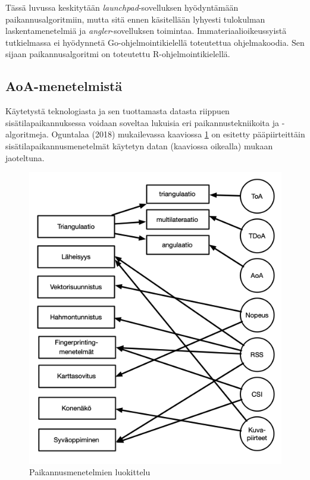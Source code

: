\documentclass[
  12pt,
  a4paper, twoside]{book}
\begin{document}
Tässä luvussa keskitytään \emph{launchpad}-sovelluksen hyödyntämään paikannusalgoritmiin, mutta sitä ennen käsitellään lyhyesti tulokulman laskentamenetelmiä ja \emph{angler}-sovelluksen toimintaa. Immateriaalioikeussyistä tutkielmassa ei hyödynnetä Go-ohjelmointikielellä toteutettua ohjelmakoodia. Sen sijaan paikannusalgoritmi on toteutettu R-ohjelmointikielellä.

\subsection{AoA-menetelmistä} \label{aoa}

Käytetystä teknologiasta ja sen tuottamasta datasta riippuen sisätilapaikannuksessa voidaan soveltaa lukuisia eri paikannustekniikoita ja -algoritmeja. Oguntalaa (2018) \citep{oguntala-2018} mukailevassa kaaviossa \ref{fig:paikannusmenetelmat} on esitetty pääpiirteittäin sisätilapaikannusmenetelmät käytetyn datan (kaaviossa oikealla) mukaan jaoteltuna.

\begin{figure}[H]
\centering
\includegraphics[width=12.5cm]{paikannusmenetelmat}
\caption{Paikannusmenetelmien luokittelu}
\label{fig:paikannusmenetelmat}
\end{figure}
\end{document}
